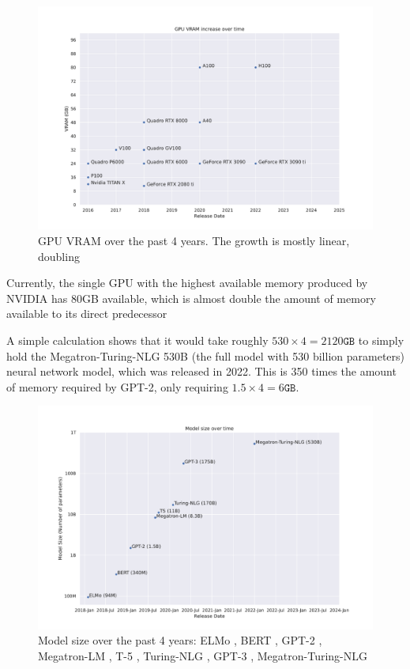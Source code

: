 \begin{figure}[h]
    \caption{GPU VRAM over the past 4 years. The growth is mostly linear, doubling }
    \label{fig:gpu-vram-over-time}
    \includegraphics[width=\textwidth]{./figures/gpu-vram-over-time.pdf}
\end{figure}

Currently, the single GPU with the highest available memory produced by NVIDIA has 80GB available, which is almost double the amount of memory available to its direct predecessor 

A simple calculation shows that it would take roughly $530 \times 4 = 2120\texttt{GB}$ to simply hold the Megatron-Turing-NLG 530B \cite{smith2022megatronturingnlg} (the full model with 530 billion parameters) neural network model, which was released in 2022.
This is 350 times the amount of memory required by GPT-2, only requiring $1.5 \times 4 = 6\texttt{GB}$.

\begin{figure}[h]
    \caption{Model size over the past 4 years: ELMo \cite{peters2018elmo}, BERT \cite{devlin2018bert}, GPT-2 \cite{radford2019language}, Megatron-LM \cite{shoeybi2019megatronlm}, T-5 \cite{raffael2019t5}, Turing-NLG \cite{microsoft2020turingnlg}, GPT-3 \cite{brown2020gpt3}, Megatron-Turing-NLG \cite{smith2022megatronturingnlg}}
    \label{fig:model-size-over-time}
    \includegraphics[width=\textwidth]{./figures/model-size-over-time.pdf}
\end{figure}


